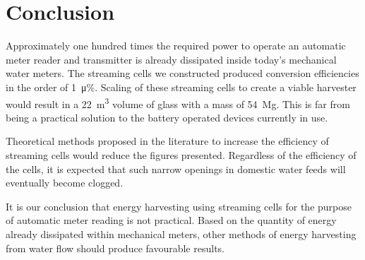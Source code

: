 \documentclass[10pt,final,journal]{IEEEtran}
\begin{document}
    \section{Conclusion}
    \label{sect:conclusion}
    Approximately one hundred times the required power to operate an automatic meter reader and transmitter is already dissipated inside today's mechanical water meters.
    The streaming cells we constructed produced conversion efficiencies in the order of \SI{1}{\micro\percent}.
    Scaling of these streaming cells to create a viable harvester would result in a \SI{22}{\cubic\metre} volume of glass with a mass of \SI{54}{\mega\gram}.
    This is far from being a practical solution to the battery operated devices currently in use.

    Theoretical methods proposed in the literature to increase the efficiency of streaming cells would reduce the figures presented.
    Regardless of the efficiency of the cells, it is expected that such narrow openings in domestic water feeds will eventually become clogged.

    It is our conclusion that energy harvesting using streaming cells for the purpose of automatic meter reading is not practical.
    Based on the quantity of energy already dissipated within mechanical meters, other methods of energy harvesting from water flow should produce favourable results.
    
    
\end{document}
